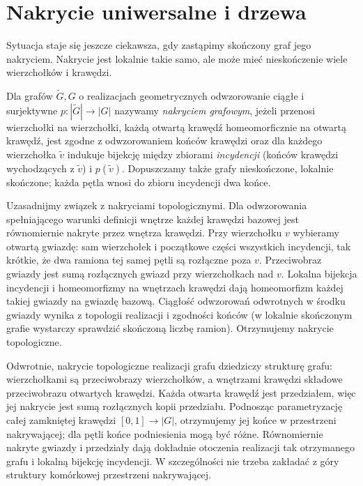 \section{Nakrycie uniwersalne i drzewa}
\label{sec:tg-universal-cover}

Sytuacja staje się jeszcze ciekawsza, gdy zastąpimy skończony graf
jego nakryciem. Nakrycie jest lokalnie takie samo, ale może mieć
nieskończenie wiele wierzchołków i krawędzi.

\begin{definicja}
Dla grafów $\widetilde G,G$ o realizacjach geometrycznych
odwzorowanie ciągłe i surjektywne
$p:|\widetilde G|\to|G|$ nazywamy
\emph{nakryciem grafowym}, jeżeli przenosi wierzchołki na
wierzchołki, każdą otwartą krawędź homeomorficznie na
otwartą krawędź, jest zgodne z odwzorowaniem końców
krawędzi oraz dla każdego wierzchołka
$\widetilde v$ indukuje bijekcję między zbiorami
\emph{incydencji} (końców krawędzi wychodzących z
$\widetilde v$) i $p(\widetilde v)$.
Dopuszczamy także grafy nieskończone, lokalnie skończone;
każda pętla wnosi do zbioru incydencji dwa końce.
\end{definicja}

Uzasadnijmy związek z nakryciami topologicznymi.
Dla odwzorowania spełniającego warunki definicji wnętrze
każdej krawędzi bazowej jest równomiernie nakryte przez
wnętrza krawędzi. Przy wierzchołku $v$ wybieramy
otwartą gwiazdę: sam wierzchołek i początkowe części
wszystkich incydencji, tak krótkie, że dwa ramiona tej
samej pętli są rozłączne poza $v$. Przeciwobraz gwiazdy
jest sumą rozłącznych gwiazd przy wierzchołkach nad $v$.
Lokalna bijekcja incydencji i homeomorfizmy na wnętrzach
krawędzi dają homeomorfizm każdej takiej gwiazdy na
gwiazdę bazową. Ciągłość odwzorowań odwrotnych w środku
gwiazdy wynika z topologii realizacji i zgodności końców
(w lokalnie skończonym grafie wystarczy sprawdzić
skończoną liczbę ramion). Otrzymujemy nakrycie topologiczne.

Odwrotnie, nakrycie topologiczne realizacji grafu
dziedziczy strukturę grafu: wierzchołkami są przeciwobrazy
wierzchołków, a wnętrzami krawędzi składowe przeciwobrazu
otwartych krawędzi. Każda otwarta krawędź jest przedziałem,
więc jej nakrycie jest sumą rozłącznych kopii przedziału.
Podnosząc parametryzację całej zamkniętej krawędzi
$[0,1]\to|G|$, otrzymujemy jej końce w przestrzeni
nakrywającej; dla pętli końce podniesienia mogą być różne.
Równomiernie nakryte gwiazdy i przedziały dają dokładnie
otoczenia realizacji tak otrzymanego grafu i lokalną
bijekcję incydencji. W szczególności nie trzeba zakładać
z góry struktury komórkowej przestrzeni nakrywającej.

